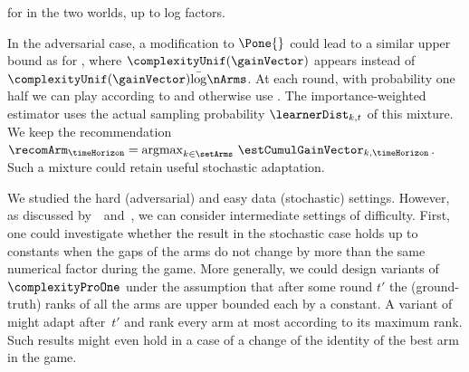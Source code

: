 for in the two worlds, up to log factors.
%
%
\begin{remark}
	In the adversarial case, a  modification to $\Pone{}$ could lead to a similar upper bound as for \RULE{},  where  $\complexityUnif(\gainVector)$ appears instead of $\complexityUnif(\gainVector)\bar\log \nArms$.
	At each round, with probability one half we can play according to \RULE{} and otherwise use \Pone{}. The importance-weighted estimator uses the actual sampling probability $\learnerDist_{k,t}$ of this mixture. We keep the  recommendation $\recomArm_\timeHorizon=\argmax_{k\in\setArms}~ 
	\estCumulGainVector_{k,\timeHorizon}$.
	Such a mixture could retain useful stochastic adaptation.
\end{remark}
%
\begin{remark}
	We studied the hard (adversarial) and easy data (stochastic) settings. 
	However, as discussed by~\cite{Seldin14OP}~and~\cite{Allesiardo17NS}, we can consider intermediate settings of difficulty.
	First, one could investigate whether the result in the stochastic case holds up
	to constants when the gaps of the arms do not change by more than the 
	same numerical factor during the game.
	More generally, we could design variants of $\complexityProOne$ under 
	the assumption that after some round $t'$ the (ground-truth) ranks of all the 
	arms are upper bounded each by a constant. %
	A variant of \Pone{} might adapt after~$t'$ and rank every arm at most according to its 
	maximum rank. Such results might even hold in 
	a case of a change of the identity of the best arm in the game.
\end{remark}%